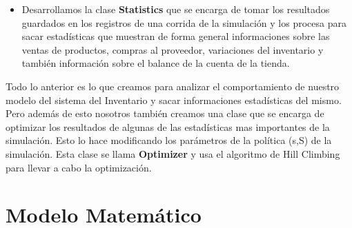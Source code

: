 \documentclass{article}
\begin{document}
\begin{itemize}
    \item Desarrollamos la clase \textbf{Statistics} que se encarga de tomar los resultados guardados en los registros de una corrida de la simulación y los procesa para sacar estadísticas que muestran de forma general informaciones sobre las ventas de productos, compras al proveedor, variaciones del inventario y también información sobre el balance de la cuenta de la tienda.
\end{itemize}

Todo lo anterior es lo que creamos para analizar el comportamiento de nuestro modelo del sistema del Inventario
y sacar informaciones estadísticas del mismo. Pero además de esto nosotros también creamos una clase que se encarga
de optimizar los resultados de algunas de las estadísticas mas importantes de la simulación. Esto lo hace modificando
los parámetros de la política (s,S) de la simulación. Esta clase se llama \textbf{Optimizer} y usa el algoritmo de Hill Climbing
para llevar a cabo la optimización.

\section{Modelo Matemático}
\end{document}
